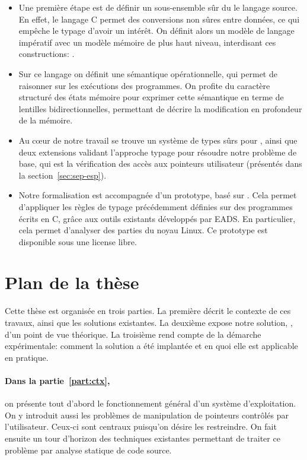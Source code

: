 \begin{itemize}

\item
Une première étape est de définir un sous-ensemble sûr du le langage source. En
effet, le langage C permet des conversions non sûres entre données, ce qui
empêche le typage d'avoir un intérêt. On définit alors un modèle de langage
impératif avec un modèle mémoire de plus haut niveau, interdisant ces
constructions: \langname.

\item
Sur ce langage on définit une sémantique opérationnelle, qui permet de raisonner
sur les exécutions des programmes. On profite du caractère structuré des états
mémoire pour exprimer cette sémantique en terme de lentilles bidirectionnelles,
permettant de décrire la modification en profondeur de la mémoire.

\item
Au cœur de notre travail se trouve un système de types sûrs pour \langname,
ainsi que deux extensions validant l'approche typage pour résoudre notre
problème de base, qui est la vérification des accès aux pointeurs utilisateur
(présentés dans la section~\ref{sec:sep-esp}).

\item
Notre formalisation est accompagnée d'un prototype, basé sur \newspeak. Cela
permet d'appliquer les règles de typage précédemment définies sur des programmes
écrits en C, grâce aux outils existants développés par EADS. En particulier,
cela permet d'analyser des parties du noyau Linux. Ce prototype est disponible
sous une license libre.

\end{itemize}

\section{Plan de la thèse}

Cette thèse est organisée en trois parties. La première décrit le contexte de
ces travaux, ainsi que les solutions existantes. La deuxième expose notre
solution, \langname, d'un point de vue théorique. La troisième rend compte de la
démarche expérimentale: comment la solution a été implantée et en quoi elle est
applicable en pratique.

\paragraph{Dans la partie~\ref{part:ctx},} on présente tout d'abord le
fonctionnement général d'un système d'exploitation. On y introduit aussi les
problèmes de manipulation de pointeurs contrôlés par l'utilisateur. Ceux-ci sont
centraux puisqu'on désire les restreindre. On fait ensuite un tour d'horizon des
techniques existantes permettant de traiter ce problème par analyse statique de
code source.

